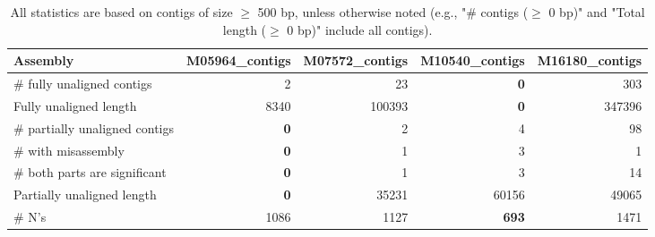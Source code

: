 \documentclass[12pt,a4paper]{article}
\begin{document}
\begin{table}[ht]
\begin{center}
\caption{All statistics are based on contigs of size $\geq$ 500 bp, unless otherwise noted (e.g., "\# contigs ($\geq$ 0 bp)" and "Total length ($\geq$ 0 bp)" include all contigs).}
\begin{tabular}{|l*{4}{|r}|}
\hline
Assembly & M05964\_contigs & M07572\_contigs & M10540\_contigs & M16180\_contigs \\ \hline
\# fully unaligned contigs & 2 & 23 & {\bf 0} & 303 \\ \hline
Fully unaligned length & 8340 & 100393 & {\bf 0} & 347396 \\ \hline
\# partially unaligned contigs & {\bf 0} & 2 & 4 & 98 \\ \hline
\hspace{5mm}\# with misassembly & {\bf 0} & 1 & 3 & 1 \\ \hline
\hspace{5mm}\# both parts are significant & {\bf 0} & 1 & 3 & 14 \\ \hline
Partially unaligned length & {\bf 0} & 35231 & 60156 & 49065 \\ \hline
\# N's & 1086 & 1127 & {\bf 693} & 1471 \\ \hline
\end{tabular}
\end{center}
\end{table}
\end{document}

